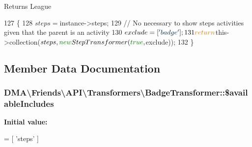 \begin{DoxyReturn}{Returns}
League 
\end{DoxyReturn}

\begin{DoxyCode}
127     \{
128         $steps = $instance->steps;
129         \textcolor{comment}{// No necessary to show steps activities given that the parent is an activity}
130         $exclude = [\textcolor{stringliteral}{'badge'}];
131         \textcolor{keywordflow}{return} $this->collection($steps, \textcolor{keyword}{new} StepTransformer(\textcolor{keyword}{true}, $exclude));
132     \}
\end{DoxyCode}


\subsection{Member Data Documentation}
\hypertarget{classDMA_1_1Friends_1_1API_1_1Transformers_1_1BadgeTransformer_aa5844dd12d509abc5bbbde77a5050e0f}{}
\subsubsection[{\$available\+Includes}]{\setlength{\rightskip}{0pt plus 5cm}D\+M\+A\textbackslash{}\+Friends\textbackslash{}\+A\+P\+I\textbackslash{}\+Transformers\textbackslash{}\+Badge\+Transformer\+::\$available\+Includes\hspace{0.3cm}{\ttfamily [protected]}}\label{classDMA_1_1Friends_1_1API_1_1Transformers_1_1BadgeTransformer_aa5844dd12d509abc5bbbde77a5050e0f}
{\bfseries Initial value\+:}
\begin{DoxyCode}
= [
            \textcolor{stringliteral}{'steps'}
    ]
\end{DoxyCode}
\hypertarget{classDMA_1_1Friends_1_1API_1_1Transformers_1_1BadgeTransformer_a82e69be5fd5e311fb322efa0a9a5958c}{}
